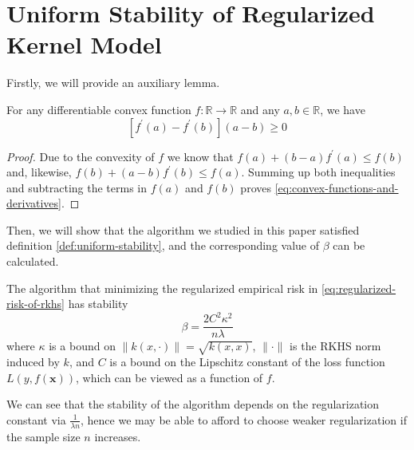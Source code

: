 \documentclass[a4paper, 12pt, mtpro2, authoryear]{elegantpaper}
\begin{document}
\section{Uniform Stability of Regularized Kernel Model}

Firstly, we will provide an auxiliary lemma.

\begin{lemma} \label{lem:convex-functions-and-derivatives}
    For any differentiable convex function $f:\mathbb{R}\rightarrow\mathbb{R}$ and any $a,b\in\mathbb{R}$, we have
    \begin{equation}
        \label{eq:convex-functions-and-derivatives}
        \left[f^{\prime}(a)-f^{\prime}(b)\right](a-b)\geq 0
    \end{equation}
\end{lemma}

\begin{proof}
    Due to the convexity of $f$ we know that $f(a)+(b-a) f^{\prime}(a) \leq f(b)$ and, likewise, $f(b)+(a-b) f^{\prime}(b) \leq f(a)$. Summing up both inequalities and subtracting the terms in $f(a)$ and $f(b)$ proves \eqref{eq:convex-functions-and-derivatives}.
\end{proof}

Then, we will show that the algorithm we studied in this paper satisfied definition \ref{def:uniform-stability}, and the corresponding value of $\beta$ can be calculated.

\begin{theorem}
    \label{thm:algorithmic-stability-of-risk-minimizers}
    The algorithm that minimizing the regularized empirical risk in \eqref{eq:regularized-risk-of-rkhs} has stability
    \begin{equation}
        \beta=\frac{2C^{2}\kappa^{2}}{n\lambda}
    \end{equation}
    where $\kappa$ is a bound on $\|k(x,\cdot)\|=\sqrt{k(x,x)}$, $\|\cdot\|$ is the RKHS norm induced by $k$, and $C$ is a bound on the Lipschitz constant of the loss function $L\left(y,f(\mathbf{x})\right)$, which can be viewed as a function of $f$.
\end{theorem}

\begin{remark}
    We can see that the stability of the algorithm depends on the regularization constant via $\frac{1}{\lambda n}$, hence we may be able to afford to choose weaker regularization if the sample size $n$ increases.
\end{remark}
\end{document}
